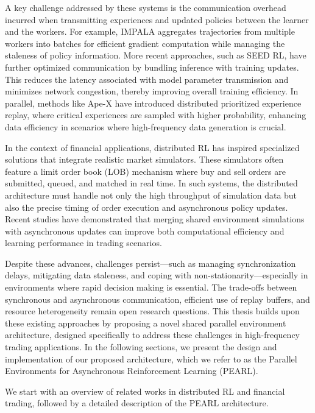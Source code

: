 A key challenge addressed by these systems is the communication overhead incurred when transmitting experiences and
updated policies between the learner and the workers.
For example, IMPALA aggregates trajectories from multiple workers into
batches for efficient gradient computation while managing the staleness of policy information.
More recent approaches, such as SEED RL, have further optimized communication by bundling inference with training updates.
This reduces the latency associated with model parameter transmission and minimizes network congestion, thereby improving overall training efficiency.
In parallel, methods like Ape-X have introduced distributed prioritized experience replay, where critical experiences are sampled with higher probability,
enhancing data efficiency in scenarios where high-frequency data generation is crucial.

In the context of financial applications, distributed RL has inspired specialized solutions that integrate realistic market simulators.
These simulators often feature a limit order book (LOB) mechanism where buy and sell orders are submitted, queued, and matched in real time.
In such systems, the distributed architecture must handle not only the high throughput of simulation data but also the
precise timing of order execution and asynchronous policy updates.
Recent studies have demonstrated that merging shared environment simulations with asynchronous updates can improve both
computational efficiency and learning performance in trading scenarios.

Despite these advances, challenges persist—such as managing synchronization delays, mitigating data staleness,
and coping with non-stationarity—especially in environments where rapid decision making is essential.
The trade-offs between synchronous and asynchronous communication, efficient use of replay buffers, and resource heterogeneity remain open research questions.
This thesis builds upon these existing approaches by proposing a novel shared parallel environment architecture,
designed specifically to address these challenges in high-frequency trading applications.
In the following sections, we present the design and implementation of our proposed architecture,
which we refer to as the Parallel Environments for Asynchronous Reinforcement Learning (PEARL).

We start with an overview of related works in distributed RL and financial trading, followed by a detailed description of the PEARL architecture.




